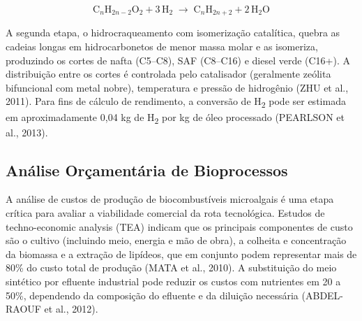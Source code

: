 \begin{equation}
    \text{C}_{n}\text{H}_{2n-2}\text{O}_{2} + 3\,\text{H}_{2}
    \;\longrightarrow\;
    \text{C}_{n}\text{H}_{2n+2} + 2\,\text{H}_{2}\text{O}
    \label{eq:hdo}
\end{equation}

A segunda etapa, o hidrocraqueamento com isomerização catalítica, quebra
as cadeias longas em hidrocarbonetos de menor massa molar e as isomeriza,
produzindo os cortes de nafta (C5--C8), SAF (C8--C16) e diesel verde
(C16+). A distribuição entre os cortes é controlada pelo catalisador
(geralmente zeólita bifuncional com metal nobre), temperatura e pressão
de hidrogênio (ZHU et al., 2011). Para fins de cálculo de rendimento, a
conversão de H\textsubscript{2} pode ser estimada em aproximadamente
0,04 kg de H\textsubscript{2} por kg de óleo processado (PEARLSON et al.,
2013).

\subsection{Análise Orçamentária de Bioprocessos}

A análise de custos de produção de biocombustíveis microalgais é uma
etapa crítica para avaliar a viabilidade comercial da rota tecnológica.
Estudos de techno-economic analysis (TEA) indicam que os principais
componentes de custo são o cultivo (incluindo meio, energia e mão de obra),
a colheita e concentração da biomassa e a extração de lipídeos, que em
conjunto podem representar mais de 80\% do custo total de produção (MATA
et al., 2010). A substituição do meio sintético por efluente industrial
pode reduzir os custos com nutrientes em 20 a 50\%, dependendo da composição
do efluente e da diluição necessária (ABDEL-RAOUF et al., 2012).

